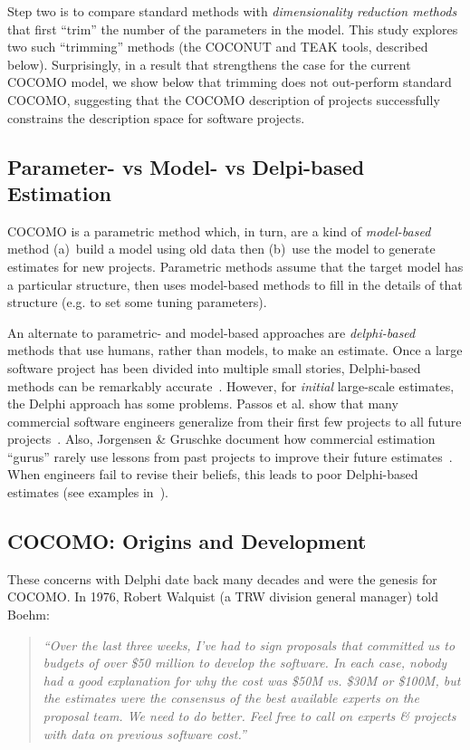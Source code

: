 \documentclass{sig-alternate}
\begin{document}
Step two is to compare standard methods
with {\em dimensionality reduction methods} that first ``trim'' the number of the parameters in the model. This study explores two such ``trimming'' methods (the COCONUT and TEAK tools, described below). Surprisingly, in a result that strengthens the case for the current COCOMO  model, we show below that trimming
does not out-perform standard COCOMO, suggesting that the COCOMO description of projects
successfully constrains the description space for software projects.

 

\subsection{Parameter- vs Model- vs Delpi-based Estimation}
COCOMO is a parametric method which, in turn,
are  a  kind of {\em model-based} method (a)~build a model using old data then (b)~use the
model to generate estimates for new projects.  Parametric methods assume that the target model has a particular structure,
then uses model-based methods to fill in the details of that structure (e.g. to set some tuning parameters).

An alternate to parametric- and model-based approaches are  {\em delphi-based} methods that use
humans, rather than models, to make an estimate. 
Once a
large software project has been divided into
multiple small stories, Delphi-based methods can be
remarkably accurate~\cite{molokk08}. However, for {\em initial} large-scale
estimates, the Delphi approach has some problems.
Passos et al. show that many
commercial software engineers generalize from their
first few projects to all future
projects~\cite{passos11}.
Also, Jorgensen \& Gruschke document how
  commercial estimation ``gurus'' rarely use lessons
  from past projects to improve their future estimates~\cite{jorgensen09}. 
When engineers
  fail to revise their beliefs, this leads to poor
  Delphi-based estimates  (see examples in~\cite{jorgensen09}).

\subsection{COCOMO: Origins and Development}
These concerns with  Delphi  date
back many decades and were the genesis for  COCOMO. In 1976, Robert Walquist (a TRW division general manager)
told  Boehm: \begin{quote}{\em ``Over the last three
weeks, I've had to sign proposals that committed us
to budgets of over \$50 million to develop the
software.  In each case, nobody had a good
explanation for why the cost was \$50M vs. \$30M or
\$100M, but the estimates were the consensus of the
best available experts on the proposal team.  We
need to do better. Feel free to call on experts
\& projects with data on previous software cost.''}\end{quote}
\end{document}
